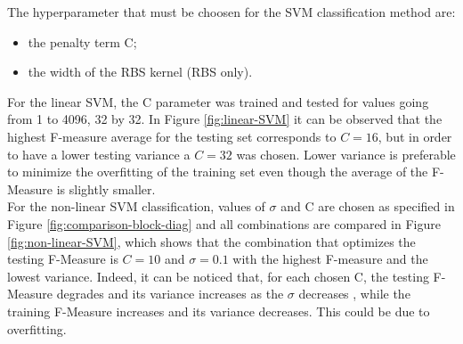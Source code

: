 \documentclass[a4paper,10pt]{article}
\begin{document}
The hyperparameter that must be choosen for the SVM classification method are:
\begin{itemize}
  \item the penalty term C;
  \item the width of the RBS kernel (RBS only).
\end{itemize}

 For the linear SVM, the C parameter was trained and tested for values going from 1 to 4096, 32 by 32. In Figure \ref{fig:linear-SVM} it can be observed that the highest F-measure average for the testing set corresponds to $C=16$, but in order to have a lower testing variance a $C = 32$ was chosen. Lower variance is preferable to minimize the overfitting of the training set even though the average of the F-Measure is slightly smaller.\\

 For the non-linear SVM classification, values of $\sigma$ and C are chosen as specified in Figure \ref{fig:comparison-block-diag} and all combinations are compared in Figure \ref{fig:non-linear-SVM}, which shows that the combination that optimizes the testing F-Measure is $ C = 10 $ and $ \sigma = 0.1$ with the highest F-measure and the lowest variance. Indeed, it can be noticed that, for each chosen C, the testing F-Measure degrades and its variance increases as the $\sigma$ decreases , while the training F-Measure increases and its variance decreases. This could be due to overfitting. 
\end{document}
